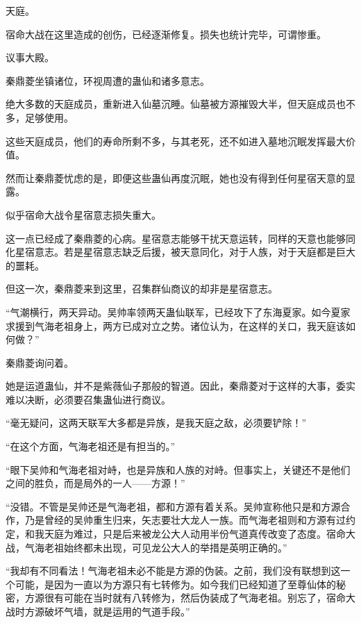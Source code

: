 
\begin{this_body}

天庭。

宿命大战在这里造成的创伤，已经逐渐修复。损失也统计完毕，可谓惨重。

议事大殿。

秦鼎菱坐镇诸位，环视周遭的蛊仙和诸多意志。

绝大多数的天庭成员，重新进入仙墓沉睡。仙墓被方源摧毁大半，但天庭成员也不多，足够使用。

这些天庭成员，他们的寿命所剩不多，与其老死，还不如进入墓地沉眠发挥最大价值。

然而让秦鼎菱忧虑的是，即便这些蛊仙再度沉眠，她也没有得到任何星宿天意的显露。

似乎宿命大战令星宿意志损失重大。

这一点已经成了秦鼎菱的心病。星宿意志能够干扰天意运转，同样的天意也能够同化星宿意志。若是星宿意志缺乏后援，被天意同化，对于人族，对于天庭都是巨大的噩耗。

但这一次，秦鼎菱来到这里，召集群仙商议的却非是星宿意志。

“气潮横行，两天异动。吴帅率领两天蛊仙联军，已经攻下了东海夏家。如今夏家求援到气海老祖身上，两方已成对立之势。诸位认为，在这样的关口，我天庭该如何做？”

秦鼎菱询问着。

她是运道蛊仙，并不是紫薇仙子那般的智道。因此，秦鼎菱对于这样的大事，委实难以决断，必须要召集蛊仙进行商议。

“毫无疑问，这两天联军大多都是异族，是我天庭之敌，必须要铲除！”

“在这个方面，气海老祖还是有担当的。”

“眼下吴帅和气海老祖对峙，也是异族和人族的对峙。但事实上，关键还不是他们之间的胜负，而是局外的一人——方源！”

“没错。不管是吴帅还是气海老祖，都和方源有着关系。吴帅宣称他只是和方源合作，乃是曾经的吴帅重生归来，矢志要壮大龙人一族。而气海老祖则和方源有过约定，和我天庭为难过，只是后来被龙公大人动用半份气道真传改变了态度。宿命大战，气海老祖始终都未出现，可见龙公大人的举措是英明正确的。”

“我却有不同看法！气海老祖未必不能是方源的伪装。之前，我们没有联想到这一个可能，是因为一直以为方源只有七转修为。如今我们已经知道了至尊仙体的秘密，方源很有可能在当时就有八转修为，然后伪装成了气海老祖。别忘了，宿命大战时方源破坏气墙，就是运用的气道手段。”


\end{this_body}
